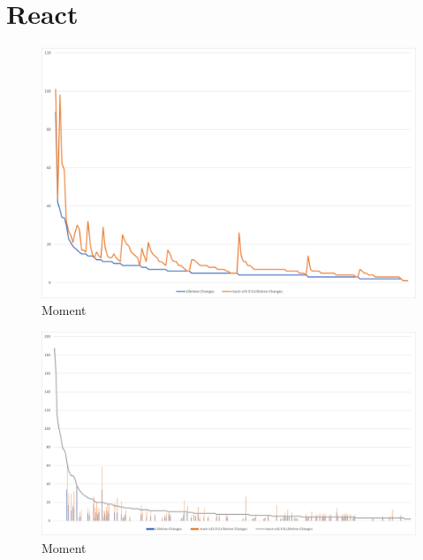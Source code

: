 \section{React}

\begin{figure}[H]
    \centering
    \includegraphics[width=1\textwidth]{images/react/react-14-15-changes.png}
    \caption{Moment}
    \label{fig:react-14-15}
\end{figure}

\begin{figure}[H]
    \centering
    \includegraphics[width=1\textwidth]{images/react/react-all-changes.png}
    \caption{Moment}
    \label{fig:react-14-15}
\end{figure}